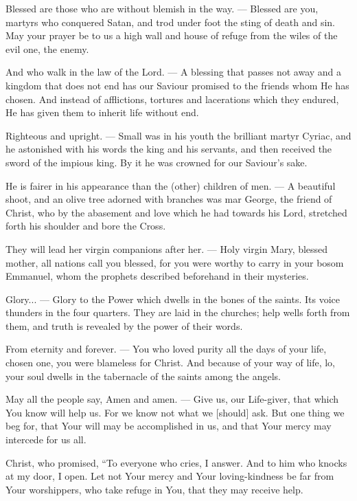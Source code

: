 \documentclass[12pt,twoside,a5paper]{article}
\begin{document}
\begin{halfparskip}
  Blessed are those who are without blemish in the way. --- Blessed are you, martyrs who conquered Satan, and trod under foot the sting of death and sin. May your prayer be to us a high wall and house of refuge from the wiles of the evil one, the enemy.

  And who walk in the law of the Lord. --- A blessing that passes not away and a kingdom that does not end has our Saviour promised to the friends whom He has chosen. And instead of afflictions, tortures and lacerations which they endured, He has given them to inherit life without end.

  Righteous and upright. --- Small was in his youth the brilliant martyr Cyriac, and he astonished with his words the king and his servants, and then received the sword of the impious king. By it he was crowned for our Saviour's sake.

  He is fairer in his appearance than the (other) children of men. --- A beautiful shoot, and an olive tree adorned with branches was mar George, the friend of Christ, who by the abasement and love which he had towards his Lord, stretched forth his shoulder and bore the Cross.

  They will lead her virgin companions after her. --- Holy virgin Mary, blessed mother, all nations call you blessed, for you were worthy to carry in your bosom Emmanuel, whom the prophets described beforehand in their mysteries.

  Glory... --- Glory to the Power which dwells in the bones of the saints. Its voice thunders in the four quarters. They are laid in the churches; help wells forth from them, and truth is revealed by the power of their words.

  From eternity and forever. --- You who loved purity all the days of your life, chosen one, you were blameless for Christ. And because of your way of life, lo, your soul dwells in the tabernacle of the saints among the angels.

  May all the people say, Amen and amen. --- Give us, our Life-giver, that which You know will help us. For we know not what we [should] ask. But one thing we beg for, that Your will may be accomplished in us, and that Your mercy may intercede for us all.

  Christ, who promised, ``To everyone who cries, I answer. And to him who knocks at my door, I open. Let not Your mercy and Your loving-kindness be far from Your worshippers, who take refuge in You, that they may receive help.
\end{halfparskip}
\end{document}
